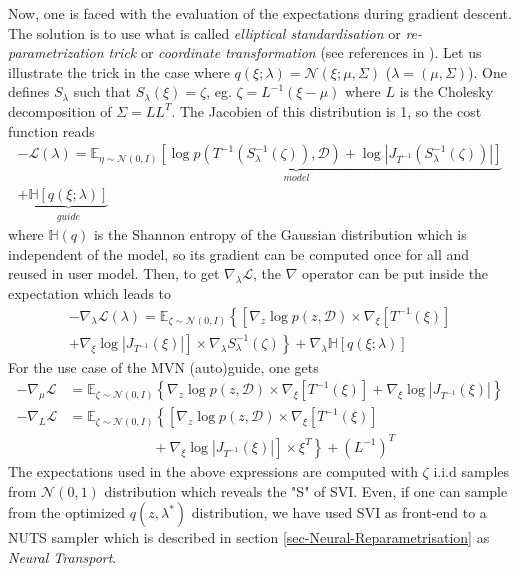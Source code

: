 \documentclass[final,5p,times,twocolumn,authoryear]{elsarticle}
\newcommand{\nn}{\nonumber}
\begin{document}
Now, one is faced with the evaluation of the expectations during gradient descent. The solution is to use what is called \textit{elliptical standardisation} or \textit{re-parametrization trick} or \textit{coordinate transformation} (see references in \citep{2015arXiv150603431K}). Let us illustrate the trick in the case where $q(\xi; \lambda) = \mathcal{N}(\xi; \mu, \Sigma)$ ($\lambda=(\mu, \Sigma)$). One defines $S_\lambda$ such that $S_\lambda(\xi)=\zeta$, eg. $\zeta = L^{-1}(\xi-\mu)$ where $L$ is the Cholesky decomposition of $\Sigma=LL^T$. The Jacobien of this distribution is 1, so the cost function reads
\begin{multline}
-\mathcal{L}(\lambda) = \underbrace{\mathbb{E}_{\eta\sim \mathcal{N}(0,I)}\left[ \log p(T^{-1}(S_\lambda^{-1}(\zeta)),\mathcal{D}) + \log |J_{T^{-1}}(S_\lambda^{-1}(\zeta))| \right]}_{model} \\ + \underbrace{\mathbb{H}[q(\xi;\lambda)]}_{guide}
\label{eq-loss-svi-3}
\end{multline}
where $\mathbb{H}(q)$ is the Shannon entropy of the Gaussian distribution which is independent of the model, so its gradient can be computed once for all and reused in user model. Then,
to get $\nabla_\lambda \mathcal{L}$, the $\nabla$ operator can be put inside the expectation which leads to
\begin{multline}
-\nabla_\lambda\mathcal{L}(\lambda) = \mathbb{E}_{\zeta\sim \mathcal{N}(0,I)}\left\{
\left[ \nabla_z \log p(z,\mathcal{D}) \times \nabla_\xi[T^{-1}(\xi)] \right. \right. \\
+ \left. \left. \nabla_\xi \log|J_{T^{-1}}(\xi)| \right] \times \nabla_\lambda S_\lambda^{-1}(\zeta)
\right\}
+ \nabla_\lambda \mathbb{H}[q(\xi;\lambda)]
\label{eq-loss-svi-4}
\end{multline}
For the use case of the MVN (auto)guide, one gets
\begin{align}
-\nabla_\mu \mathcal{L} &= \mathbb{E}_{\zeta\sim \mathcal{N}(0,I)}\left\{
\nabla_z \log p(z,\mathcal{D}) \times \nabla_\xi[T^{-1}(\xi)]
+ \nabla_\xi \log|J_{T^{-1}}(\xi)|
\right\} \nn \\
-\nabla_L \mathcal{L} &= \mathbb{E}_{\zeta\sim \mathcal{N}(0,I)}\left\{
\left[ \nabla_z \log p(z,\mathcal{D}) \times \nabla_\xi[T^{-1}(\xi)] \right.\right. \nn\\
&\left. \left. \qquad\qquad\qquad + \nabla_\xi \log|J_{T^{-1}}(\xi)| \right] \times \xi^T 
\right\}+ (L^{-1})^T
\end{align}
The expectations used in the above expressions are computed with $\zeta$ i.i.d samples from $\mathcal{N}(0,1)$ distribution which reveals the "S" of SVI. Even, if one can sample from the optimized  $q(z,\lambda^\ast)$ distribution, we have used SVI as front-end to  a NUTS sampler which is described in section \ref{sec-Neural-Reparametrisation} as \textit{Neural Transport}.
%
\end{document}
